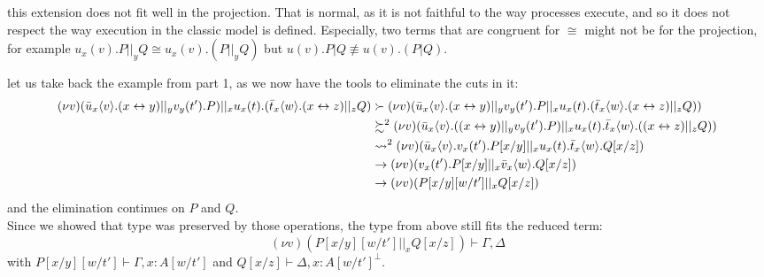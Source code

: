 \remark this extension does not fit well in the projection. That is normal, as it is not faithful to the way processes execute, and so it does not respect the way execution in the classic model is defined. Especially, two terms that are congruent for $\cong$ might not be for the projection, for example $u_x(v).P ||_y Q \cong u_x(v).(P||_yQ)$ but $u(v).P|Q\not\equiv u(v).(P|Q)$.

\example let us take back the example from part 1, as we now have the tools to eliminate the cuts in it:
\begin{align*}
(\nu v)(\bar{u}_x\langle v\rangle.(x\leftrightarrow y) ||_y v_y(t').P) ||_x u_x(t).(\bar{t}_x\langle w\rangle.(x\leftrightarrow z) ||_z Q)
	&\succ (\nu v)(\bar{u}_x\langle v\rangle.(x\leftrightarrow y) ||_y v_y(t').P ||_x u_x(t).(\bar{t}_x\langle w\rangle.(x\leftrightarrow z) ||_z Q))\\
	&\succsim^2 (\nu v)(\bar{u}_x\langle v\rangle.((x\leftrightarrow y) ||_y v_y(t').P) ||_x u_x(t).\bar{t}_x\langle w\rangle.((x\leftrightarrow z) ||_z Q))\\
	&\leadsto^2 (\nu v)(\bar{u}_x\langle v\rangle.v_x(t').P[x/y] ||_x u_x(t).\bar{t}_x\langle w\rangle.Q[x/z])\\
	&\to (\nu v)(v_x(t').P[x/y] ||_x \bar{v}_x\langle w\rangle.Q[x/z])\\
	&\to (\nu v)(P[x/y][w/t'] ||_x Q[x/z])\\
\end{align*}
and the elimination continues on $P$ and $Q$.\\
Since we showed that type was preserved by those operations, the type from above still fits the reduced term:
\[(\nu v)(P[x/y][w/t'] ||_x Q[x/z]) \vdash \Gamma, \Delta\]
with $P[x/y][w/t'] \vdash \Gamma, x:A[w/t']$ and $Q[x/z] \vdash \Delta, x:A[w/t']^\bot$.